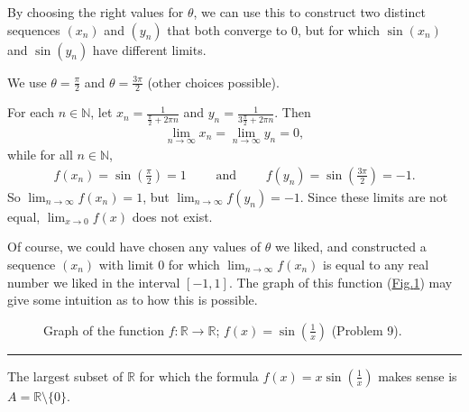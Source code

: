 \documentclass[letterpaper,10pt,english]{jupyterBook}
\let\sphinxpxdimen\pdfpxdimen\else\newdimen\sphinxpxdimen
\begin{document}
By choosing the right values for \(\theta\), we can use this to construct two distinct sequences \((x_n)\) and \((y_n)\) that both converge to \(0\), but for which \(\sin(x_n)\) and \(\sin(y_n)\) have different limits.

We use \(\theta=\frac{\pi}{2}\) and \(\theta=\frac{3\pi}{2}\) (other choices possible).

For each \(n\in\mathbb{N}\), let \(x_n=\frac{1}{\frac{\pi}{2} + 2\pi n}\) and \(y_n=\frac{1}{3\frac{\pi}{2} + 2\pi n}\). Then
\begin{equation*}
\begin{split}
\lim_{n\rightarrow\infty} x_{n} =\lim_{n\rightarrow\infty} y_n= 0,
\end{split}
\end{equation*}
\sphinxAtStartPar
while for all \(n\in\mathbb{N}\),
\begin{equation*}
\begin{split}
f(x_n) = \sin\left(\frac{\pi}{2}\right) =1 \hspace{2em} \text{ and } \hspace{2em} f(y_n)=\sin\left(\frac{3\pi}{2}\right)=-1.
\end{split}
\end{equation*}
\sphinxAtStartPar
So \(\lim_{n\rightarrow\infty} f(x_{n}) = 1\), but \(\lim_{n\rightarrow\infty} f(y_n) = -1\). Since these limits are not equal, \(\lim_{x\to 0} f(x)\) does not exist.

Of course, we could have chosen any values of \(\theta\) we liked, and constructed a sequence \((x_n)\) with limit \(0\) for which \(\lim_{n\rightarrow\infty}f(x_n)\) is equal to any real number we liked in the interval \([-1,1]\). The graph of this function (\hyperref[\detokenize{Solutions-full:s1x}]{Fig.\@ \ref{\detokenize{Solutions-full:s1x}}}) may give some intuition as to how this is possible.

\begin{figure}[htbp]
\centering
\capstart

\noindent\sphinxincludegraphics[width=700\sphinxpxdimen]{{sin(1,x)}.png}
\caption{Graph of the function \(f:\mathbb{R}\to\mathbb{R}\); \(f(x)=\sin\left(\frac{1}{x}\right)\) (Problem 9).}\label{\detokenize{Solutions-full:s1x}}\end{figure}


\bigskip\hrule\bigskip


\sphinxAtStartPar
{\hyperref[\detokenize{Problems:id10}]{}} The largest subset of \(\mathbb{R}\) for which the formula \(f(x)=x\sin\left(\frac{1}{x}\right)\) makes sense is \(A = \mathbb{R} \setminus \{0\}\).
\end{document}
